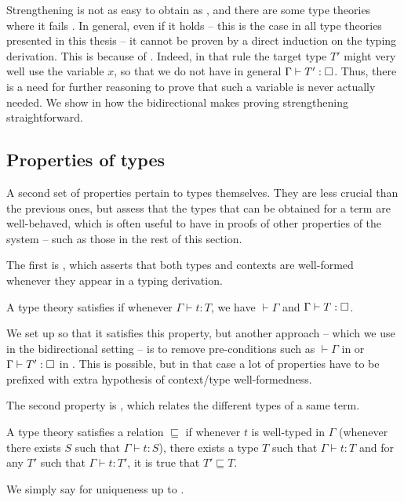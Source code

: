 Strengthening is not as easy to obtain as , and there are some type theories
where it fails .
In general, even if it holds – this is the case in all type theories 
presented in this thesis – it cannot be proven by a direct induction on the typing
derivation. This is because of . Indeed, in that rule the target type
$T'$ might very well use the variable $x$, so that we do not have in general
$\Gamma \vdash T' : \uni$. Thus, there is a need for further reasoning to prove that such a
variable is never actually needed. We show in  how the bidirectional
makes proving strengthening straightforward.

\subsection{Properties of types}

A second set of properties pertain to types themselves. They are less crucial than the
previous ones, but assess that the types that can be obtained for a term are well-behaved,
which is often useful to have in proofs of other properties of
the system – such as those in the rest of this section.

The first is ,
which asserts that both types and contexts are well-formed whenever they appear in a typing
derivation.

\begin{property}[Validity]
  \label{prop:validity}
  A type theory satisfies  if whenever $\Gamma \vdash t : T$, we have
  $\vdash \Gamma$ and $\Gamma \vdash T : \uni$.
\end{property}

We set up  so that it satisfies this property, but another approach – which we use
in the bidirectional setting – is to remove pre-conditions such as $\vdash \Gamma$ in
 or $\Gamma \vdash T' : \uni$ in .
This is possible, but in that case a lot of properties have to be prefixed with extra
hypothesis of context/type well-formedness.

The second property is , which relates the different types
of a same term.

\begin{property}
  \label{prop:uniqueness}
  A type theory satisfies  a relation $\sqsubseteq$
  if whenever $t$ is well-typed in $\Gamma$ (\ie whenever there exists $S$ such that $\Gamma \vdash t : S$), there exists a type $T$ such that $\Gamma \vdash t : T$
  and for any $T'$ such that $\Gamma \vdash t : T'$, it is true that $T' \sqsubseteq T$.

  We simply say  for uniqueness up to .
\end{property}

